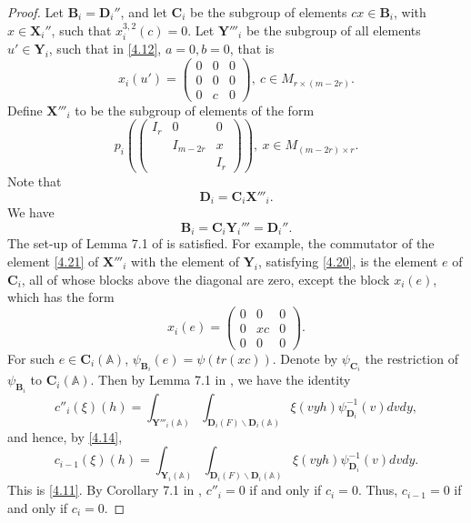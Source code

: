 \documentclass[12pts]{amsart}
\newcommand{\BA}{{\mathbb {A}}}
\begin{document}
\begin{proof}
	Let $\mathbf{B}_i=\mathbf{D}_i''$, and let $\mathbf{C}_i$ be the subgroup of elements $cx\in \mathbf{B}_i$, with $x\in \mathbf{X}_i''$, such that $x^{3,2}_i(c)=0$. Let $\mathbf{Y}'''_i$ be the subgroup of all elements $u'\in \mathbf{Y}_i$, such that in \eqref{4.12}, $a=0, b=0$, that is 
	\begin{equation}\label{4.20}
	x_i(u')=\begin{pmatrix}0&0&0\\0&0&0\\0&c&0\end{pmatrix}, \ c\in M_{r\times (m-2r)}.
	\end{equation}
	Define $\mathbf{X}'''_i$ to be the subgroup of elements of the form 
	\begin{equation}\label{4.21}
	p_i(\begin{pmatrix}I_r&0&0\\&I_{m-2r}&x\\&&I_r\end{pmatrix}),\ x\in M_{(m-2r)\times r}.
	\end{equation}
	Note that 
	$$
	\mathbf{D}_i=\mathbf{C}_i\mathbf{X}'''_i.
	$$
	We have 
	$$
	\mathbf{B}_i=\mathbf{C}_i\mathbf{Y}_i'''=\mathbf{D}_i''.
	$$
	The set-up of Lemma 7.1 of \cite{GRS11} is satisfied. For example, the commutator of the element \eqref{4.21} of $\mathbf{X}'''_i$ with the element of $\mathbf{Y}_i$, satisfying \eqref{4.20}, is the element $e$ of $\mathbf{C}_i$, all of whose blocks above the diagonal are zero, except the block $x_i(e)$, which has the form
	$$
	x_i(e)=\begin{pmatrix}0&0&0\\0&xc&0\\0&0&0\end{pmatrix}.
	$$
	For such $e\in \mathbf{C}_i(\BA)$, $\psi_{\mathbf{B}_i}(e)=\psi(tr(xc))$. Denote by $\psi_{\mathbf{C}_i}$ the restriction of $\psi_{\mathbf{B}_i}$ to $\mathbf{C}_i(\BA)$. Then by Lemma 7.1 in \cite{GRS11}, we have the identity
	\begin{equation}\label{4.22}
	c''_i(\xi)(h)=\int_{\mathbf{Y}'''_i(\BA)}\int_{\mathbf{D}_i(F)\backslash \mathbf{D}_i(\BA)}\xi(vyh)\psi_{\mathbf{D}_i}^{-1}(v)dvdy,
	\end{equation}
	and hence, by \eqref{4.14},
	\begin{equation}\label{4.23}
	c_{i-1}(\xi)(h)=\int_{\mathbf{Y}_i(\BA)}\int_{\mathbf{D}_i(F)\backslash \mathbf{D}_i(\BA)}\xi(vyh)\psi_{\mathbf{D}_i}^{-1}(v)dvdy.
	\end{equation}
	This is \eqref{4.11}. By Corollary 7.1 in \cite{GRS11},
	$c''_i=0$ if and only if $c_i=0$. Thus, $c_{i-1}=0$ if and only if $c_i=0$.
\end{proof}
\end{document}
